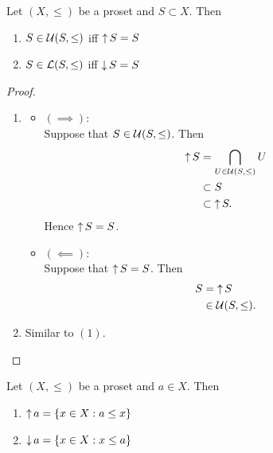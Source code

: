\documentclass{book}
\begin{document}
	\begin{ex} 
		Let $(X, \leq)$ be a proset and $S \subset X$. Then
		\begin{enumerate}
			\item $S \in \mathcal{U}(S, \leq)$ iff $\operatorname{\uparrow} S = S$ 
			\item $S \in \mathcal{L}(S, \leq)$ iff $\operatorname{\downarrow} S = S$
		\end{enumerate}
	\end{ex}
	
	\begin{proof}\
		\begin{enumerate}
			\item
			\begin{itemize}
				\item $(\implies)$: \\
				Suppose that $S \in \mathcal{U}(S, \leq)$. Then 
				\begin{align*}
					\operatorname{\uparrow} S
					& = \bigcap\limits_{U \in \mathcal{U}(S, \leq)} U \\
					& \subset S \\
					& \subset \operatorname{\uparrow} S.
				\end{align*}
				Hence $\operatorname{\uparrow} S = S$.
				\item $(\impliedby)$: \\
				Suppose that $\operatorname{\uparrow} S = S$. Then 
				\begin{align*}
					S
					& = \operatorname{\uparrow} S \\
					& \in \mathcal{U}(S, \leq).
				\end{align*}
			\end{itemize}
			\item Similar to $(1)$.
		\end{enumerate}
	\end{proof}
	
	\begin{ex} 
		Let $(X, \leq)$ be a proset and $a \in X$. Then 
		\begin{enumerate}
			\item $\operatorname{\uparrow} a = \{x \in X: a \leq x\}$
			\item $\operatorname{\downarrow} a = \{x \in X: x \leq a\}$
		\end{enumerate}
	\end{ex}
	
\end{document}
